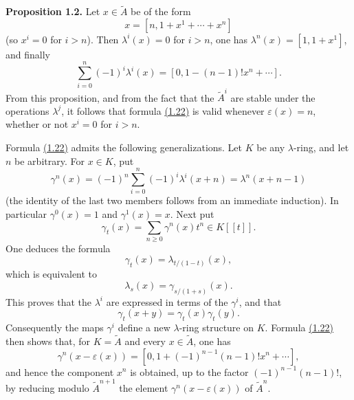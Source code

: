 \textbf{Proposition 1.2.} Let $x\in\widetilde A$ be of the form
\[
x=[n,1+x^1+\cdots+x^n]
\]
(so $x^i=0$ for $i>n$). Then $\lambda^i(x)=0$ for $i>n$, one has $\lambda^n(x)=[1,1+x^1]$, and finally
\begin{equation}\tag{1.22}
\sum_{i=0}^{n}(-1)^i\lambda^i(x)=[0,1-(n-1)!x^n+\cdots].
\end{equation}
From this proposition, and from the fact that the $\widetilde A^i$ are stable under the operations $\lambda^j$, it follows that formula \hyperlink{sga6.e00.eq.1-22}{(1.22)} is valid whenever $\varepsilon(x)=n$, whether or not $x^i=0$ for $i>n$.

Formula \hyperlink{sga6.e00.eq.1-22}{(1.22)} admits the following generalizations. Let $K$ be any $\lambda$-ring, and let $n$ be arbitrary. For $x\in K$, put
\begin{equation}\tag{1.23}
\gamma^n(x)=(-1)^n\sum_{i=0}^{n}(-1)^i\lambda^i(x+n)=\lambda^n(x+n-1)
\end{equation}
(the identity of the last two members follows from an immediate induction). In particular $\gamma^0(x)=1$ and $\gamma^1(x)=x$. Next put
\begin{equation}\tag{1.24}
\gamma_t(x)=\sum_{n\geq 0}\gamma^n(x)t^n\in K[[t]].
\end{equation}
One deduces the formula
\begin{equation}\tag{1.25}
\gamma_t(x)=\lambda_{t/(1-t)}(x),
\end{equation}
which is equivalent to
\begin{equation}\tag{1.25 bis}
\lambda_s(x)=\gamma_{s/(1+s)}(x).
\end{equation}
This proves that the $\lambda^i$ are expressed in terms of the $\gamma^i$, and that
\[
\gamma_t(x+y)=\gamma_t(x)\gamma_t(y).
\]
Consequently the maps $\gamma^i$ define a new $\lambda$-ring structure on $K$. Formula \hyperlink{sga6.e00.eq.1-22}{(1.22)} then shows that, for $K=\widetilde A$ and every $x\in\widetilde A$, one has
\begin{equation}\tag{1.22 bis}
\gamma^n(x-\varepsilon(x))=[0,1+(-1)^{n-1}(n-1)!x^n+\cdots],
\end{equation}
and hence the component $x^n$ is obtained, up to the factor $(-1)^{n-1}(n-1)!$, by reducing modulo $\widetilde A^{n+1}$ the element $\gamma^n(x-\varepsilon(x))$ of $\widetilde A^n$.

